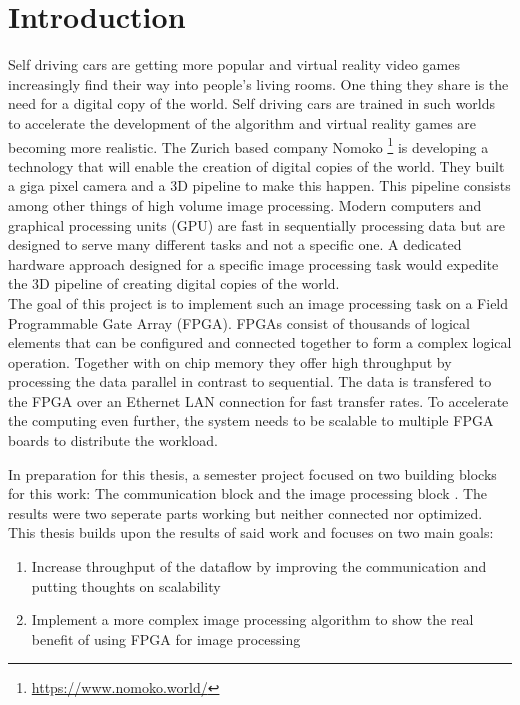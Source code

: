 
%
%
\chapter{Introduction}
Self driving cars are getting more popular and virtual reality video games
increasingly find their way into people's living rooms. One thing they share is
the need for a digital copy of the world. Self driving cars are trained in such
worlds to
accelerate the development of the algorithm and virtual reality games are
becoming more realistic. The Zurich based company Nomoko \footnote{
\url{https://www.nomoko.world/}} is developing a
technology that will enable the creation of digital copies of the world. They
built a giga pixel camera and a 3D pipeline to make this happen. This pipeline
consists among other things of high volume image processing. Modern computers
and graphical processing units (GPU) are fast in sequentially processing data
but are designed to serve many different tasks and not a specific one. A
dedicated hardware approach designed for a specific image processing task would
expedite the 3D pipeline of creating digital copies of the world.
\\

The goal of this project is to implement such an image processing task on a
Field
Programmable Gate Array (FPGA). FPGAs
consist of thousands of logical elements that can be configured and connected
together to form a complex logical operation. Together with on chip
memory they offer high throughput by processing the data parallel in contrast to
sequential. The data is transfered to the FPGA over an Ethernet LAN connection
for
fast transfer rates. To accelerate the computing even further, the system needs
to be scalable to multiple FPGA boards to distribute the workload.

In preparation for this thesis, a semester project focused on two building
blocks for this work: The communication block and the image processing block
\cite{p5report}. The results were two seperate parts working but neither
connected nor optimized. This thesis builds upon the results of said work and
focuses on two main goals:
\\

\begin{enumerate}
    \item Increase throughput of the dataflow by improving the communication and putting thoughts on scalability
    \item Implement a more complex image processing algorithm to show the real
    benefit of using FPGA for image processing
\end{enumerate}
%     

